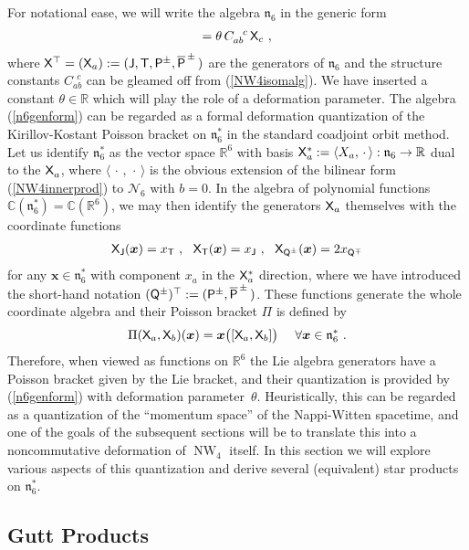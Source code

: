\documentclass[11pt,a4paper]{article}
\DeclareMathOperator{\NW}{NW}
\newcommand{\mbf}[1]{{\boldsymbol {#1} }}
\def\P{{\sf P}}
\def\T{{\sf T}}
\def\X{{\sf X}}
\def\Q{{\sf Q}}
\def\J{{\sf J}}
\def\mx{{\mbf x}}
\def\mfn{{\mathfrak n}}
\newcommand{\complex}{{\mathbb C}} %
\newcommand{\real}{{\mathbb R}} %
\newcommand{\beq}{\begin{eqnarray}}
\newcommand{\eeq}{\end{eqnarray}}
\begin{document}
For notational ease, we will write the algebra $\mathfrak{n}_6$ in the
generic form
\beq
[\X_a,\X_b]=\theta\,C_{ab}^{~~c}\,\X_c \ ,
\label{n6genform}\eeq
where $\X^\top=(\X_a):=(\J,\T,\P^\pm,\overline{\P}^{\,\pm}\,)$ are the
generators of $\mathfrak{n}_6$ and the structure constants
$C_{ab}^{~~c}$ can be gleamed off from (\ref{NW4isomalg}). We have
inserted a constant $\theta\in\real$ which will play the role of a
deformation parameter. The algebra (\ref{n6genform}) can be regarded
as a formal deformation quantization of the Kirillov-Kostant Poisson bracket on
$\mathfrak{n}_6^*$ in the standard coadjoint orbit method. Let us
identify $\mathfrak{n}_6^*$ as the vector space $\real^6$ with basis
$\X_a^*:=\langle X_a,\,\cdot\,\rangle:\mfn_6\to\real$ dual to the
$\X_a^{~}$, where $\langle\,\cdot\,,\,\cdot\,\rangle$ is the obvious
extension of the bilinear form (\ref{NW4innerprod}) to $\mathcal{N}_6$
with $b=0$. In the algebra of polynomial functions
$\complex(\mathfrak{n}_6^*)=\complex(\real^6)$, we may then identify
the generators $\X_a$ themselves with the coordinate functions
\beq
\X_\J(\mx)=x_\T \ , ~~ \X_\T(\mx)=x_\J \ , ~~ \X_{\Q^\pm}(\mx)=
2x_{\Q^\mp}
\label{Xacoordfns}\eeq
for any $\mx\in\mathfrak{n}_6^*$ with component $x_a$ in the $\X_a^*$
direction, where we have introduced the short-hand notation
$(\Q^\pm)^\top:=(\P^\pm,\overline{\P}^{\,\pm}\,)$. These functions
generate the whole coordinate algebra and their Poisson bracket $\Pi$
is defined by
\beq
\Pi(\X_a,\X_b)(\mx)=\mx\bigl([\X_a,\X_b]\bigr) ~~~~ \forall\mx\in
\mathfrak{n}_6^* \ .
\label{KKXadef}\eeq
Therefore, when viewed as functions on $\real^6$ the Lie algebra
generators have a Poisson bracket given by the Lie bracket, and their
quantization is provided by (\ref{n6genform}) with deformation
parameter~$\theta$. Heuristically, this can be regarded as a
quantization of the ``momentum space'' of the Nappi-Witten spacetime,
and one of the goals of the subsequent sections will be to translate this
into a noncommutative deformation of $\NW_4$ itself. In this section
we will explore various aspects of this quantization and derive
several (equivalent) star products on $\mfn_6^*$.

\subsection{Gutt Products\label{StarProds}}
\end{document}
